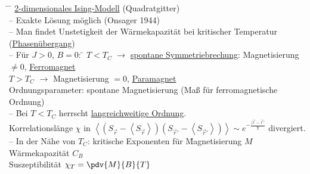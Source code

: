 \begin{figure}[H]
  \centering
\end{figure}
\begin{tabbing}
\hspace{4em} \= \hspace{4em} \= \kill
\underline{2-dimensionales Ising-Modell} (Quadratgitter)\\
-- Exakte Lösung möglich (Onsager 1944)\\
-- Man findet Unstetigkeit der Wärmekapazität bei kritischer Temperatur (\underline{Phasenübergang})\\
-- Für $J > 0$, $B = 0$: \= $T < T_C$ $\rightarrow$ \underline{spontane Symmetriebrechung}: Magnetisierung $\neq 0$, \underline{Ferromagnet}\\
\> $T>T_C$ $\rightarrow$ Magnetisierung $=0$, \underline{Paramagnet}\\
Ordnungsparameter: spontane Magnetisierung (Maß für ferromagnetische Ordnung)\\
-- \= Bei $T<T_C$ herrscht \underline{langreichweitige Ordnung}.\\
\> Korrelationslänge $\chi$ in $\left\langle\left(S_{\vec{r}} - \left\langle S_{\vec{r}}\right\rangle\right)\left(S_{\vec{r}'} - \left\langle S_{\vec{r}'}\right\rangle\right)\right\rangle \sim e^{-\frac{|\vec{r} - \vec{r}'}{\chi}}$ divergiert.\\
-- In der Nähe von $T_C$: kritische Exponenten für \= Magnetisierung $M$\\
\> Wärmekapazität $C_B$\\
\> Suszeptibilität $\chi_T = \pdv{M}{B}{T}$
\end{tabbing}


